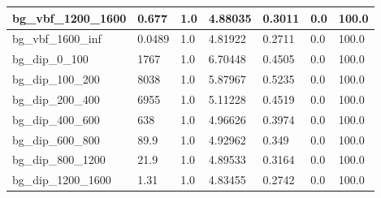 \documentclass[a4paper, 10pt]{article}
\begin{document}
\begin{table}[H]
\begin{center}
\begin{tabular}{|m{23.0mm}|m{23.0mm}|m{18.0mm}|m{19.0mm}|m{19.0mm}|m{19.0mm}|m{19.0mm}|}
      \hline
      {\cellcolor{white}         bg\_vbf\_1200\_1600}& {\cellcolor{white}         0.677}& {\cellcolor{white}         1.0}& {\cellcolor{white}         4.88035}& {\cellcolor{white}         0.3011}& {\cellcolor{red}         0.0}& {\cellcolor{red}         100.0}\\
      \hline
      {\cellcolor{white}         bg\_vbf\_1600\_inf}& {\cellcolor{white}         0.0489}& {\cellcolor{white}         1.0}& {\cellcolor{white}         4.81922}& {\cellcolor{white}         0.2711}& {\cellcolor{red}         0.0}& {\cellcolor{red}         100.0}\\
      \hline
      {\cellcolor{white}         bg\_dip\_0\_100}& {\cellcolor{white}         1767}& {\cellcolor{white}         1.0}& {\cellcolor{white}         6.70448}& {\cellcolor{white}         0.4505}& {\cellcolor{red}         0.0}& {\cellcolor{red}         100.0}\\
      \hline
      {\cellcolor{white}         bg\_dip\_100\_200}& {\cellcolor{white}         8038}& {\cellcolor{white}         1.0}& {\cellcolor{white}         5.87967}& {\cellcolor{white}         0.5235}& {\cellcolor{red}         0.0}& {\cellcolor{red}         100.0}\\
      \hline
      {\cellcolor{white}         bg\_dip\_200\_400}& {\cellcolor{white}         6955}& {\cellcolor{white}         1.0}& {\cellcolor{white}         5.11228}& {\cellcolor{white}         0.4519}& {\cellcolor{red}         0.0}& {\cellcolor{red}         100.0}\\
      \hline
      {\cellcolor{white}         bg\_dip\_400\_600}& {\cellcolor{white}         638}& {\cellcolor{white}         1.0}& {\cellcolor{white}         4.96626}& {\cellcolor{white}         0.3974}& {\cellcolor{red}         0.0}& {\cellcolor{red}         100.0}\\
      \hline
      {\cellcolor{white}         bg\_dip\_600\_800}& {\cellcolor{white}         89.9}& {\cellcolor{white}         1.0}& {\cellcolor{white}         4.92962}& {\cellcolor{white}         0.349}& {\cellcolor{red}         0.0}& {\cellcolor{red}         100.0}\\
      \hline
      {\cellcolor{white}         bg\_dip\_800\_1200}& {\cellcolor{white}         21.9}& {\cellcolor{white}         1.0}& {\cellcolor{white}         4.89533}& {\cellcolor{white}         0.3164}& {\cellcolor{red}         0.0}& {\cellcolor{red}         100.0}\\
      \hline
      {\cellcolor{white}         bg\_dip\_1200\_1600}& {\cellcolor{white}         1.31}& {\cellcolor{white}         1.0}& {\cellcolor{white}         4.83455}& {\cellcolor{white}         0.2742}& {\cellcolor{red}         0.0}& {\cellcolor{red}         100.0}\\

\end{tabular}
\end{center}
\end{table}
\end{document}
